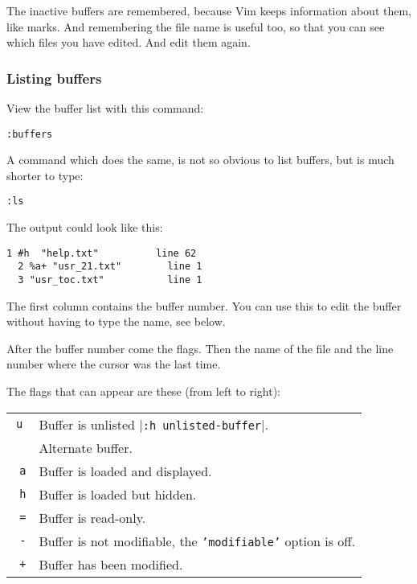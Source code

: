 The inactive buffers are remembered, because Vim keeps information about them, like marks.
And remembering the file name is useful too, so that you can see which files you have edited.
And edit them again.

\subsubsection{Listing buffers}
View the buffer list with this command:

\begin{Verbatim}[samepage=true]
 :buffers
\end{Verbatim}

A command which does the same, is not so obvious to list buffers, but is much shorter to type:

\begin{Verbatim}[samepage=true]
 :ls
\end{Verbatim}

The output could look like this:

\begin{Verbatim}[samepage=true]
  1 #h  "help.txt"          line 62 
  2 %a+ "usr_21.txt"        line 1 
  3 "usr_toc.txt"           line 1 
\end{Verbatim}

The first column contains the buffer number.
You can use this to edit the buffer without having to type the name, see below.

After the buffer number come the flags.
Then the name of the file and the line number where the cursor was the last time.
 
The flags that can appear are these (from left to right):
\begin{center} \begin{tabular}{c l}
				\texttt{u} &  Buffer is unlisted |\texttt{:h unlisted-buffer}|. \\
				\texttt{  %
				\texttt{  #} &  Alternate buffer. \\
				\texttt{    a} & Buffer is loaded and displayed. \\
				\texttt{    h} & Buffer is loaded but hidden. \\
				\texttt{      =} & Buffer is read-only. \\
				\texttt{      -} & Buffer is not modifiable, the \texttt{'modifiable'} option is off. \\
				\texttt{        +} & Buffer has been modified. \\
\end{tabular} \end{center}
